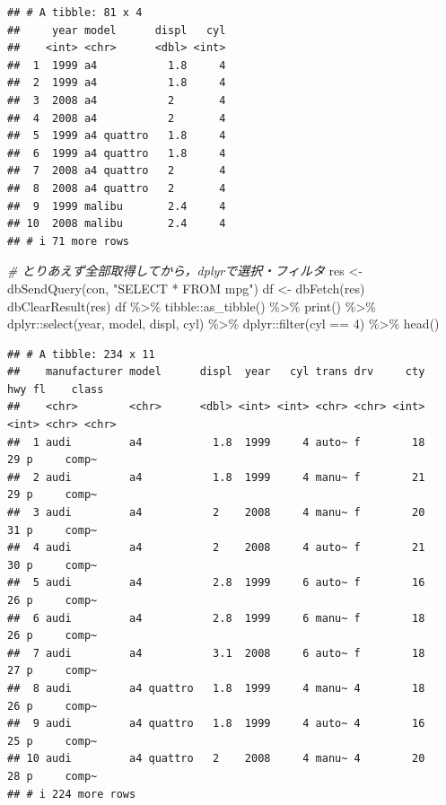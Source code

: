 \documentclass[
]{article}
\newenvironment{Shaded}{\begin{snugshade}}{\end{snugshade}}
\newcommand{\CommentTok}[1]{\textcolor[rgb]{0.56,0.35,0.01}{\textit{#1}}}
\newcommand{\DecValTok}[1]{\textcolor[rgb]{0.00,0.00,0.81}{#1}}
\newcommand{\FunctionTok}[1]{\textcolor[rgb]{0.00,0.00,0.00}{#1}}
\newcommand{\NormalTok}[1]{#1}
\newcommand{\OtherTok}[1]{\textcolor[rgb]{0.56,0.35,0.01}{#1}}
\newcommand{\SpecialCharTok}[1]{\textcolor[rgb]{0.00,0.00,0.00}{#1}}
\newcommand{\StringTok}[1]{\textcolor[rgb]{0.31,0.60,0.02}{#1}}
\begin{document}
\begin{verbatim}
## # A tibble: 81 x 4
##     year model      displ   cyl
##    <int> <chr>      <dbl> <int>
##  1  1999 a4           1.8     4
##  2  1999 a4           1.8     4
##  3  2008 a4           2       4
##  4  2008 a4           2       4
##  5  1999 a4 quattro   1.8     4
##  6  1999 a4 quattro   1.8     4
##  7  2008 a4 quattro   2       4
##  8  2008 a4 quattro   2       4
##  9  1999 malibu       2.4     4
## 10  2008 malibu       2.4     4
## # i 71 more rows
\end{verbatim}

\begin{Shaded}
\begin{Highlighting}[]
  \CommentTok{\# とりあえず全部取得してから，dplyrで選択・フィルタ}
\NormalTok{res }\OtherTok{\textless{}{-}} \FunctionTok{dbSendQuery}\NormalTok{(con, }\StringTok{"SELECT * FROM mpg"}\NormalTok{)}
\NormalTok{df }\OtherTok{\textless{}{-}} \FunctionTok{dbFetch}\NormalTok{(res)}
\FunctionTok{dbClearResult}\NormalTok{(res)}
\NormalTok{df }\SpecialCharTok{\%\textgreater{}\%}
\NormalTok{  tibble}\SpecialCharTok{::}\FunctionTok{as\_tibble}\NormalTok{() }\SpecialCharTok{\%\textgreater{}\%}
  \FunctionTok{print}\NormalTok{() }\SpecialCharTok{\%\textgreater{}\%}
\NormalTok{  dplyr}\SpecialCharTok{::}\FunctionTok{select}\NormalTok{(year, model, displ, cyl) }\SpecialCharTok{\%\textgreater{}\%}
\NormalTok{  dplyr}\SpecialCharTok{::}\FunctionTok{filter}\NormalTok{(cyl }\SpecialCharTok{==} \DecValTok{4}\NormalTok{) }\SpecialCharTok{\%\textgreater{}\%}
  \FunctionTok{head}\NormalTok{()}
\end{Highlighting}
\end{Shaded}

\begin{verbatim}
## # A tibble: 234 x 11
##    manufacturer model      displ  year   cyl trans drv     cty   hwy fl    class
##    <chr>        <chr>      <dbl> <int> <int> <chr> <chr> <int> <int> <chr> <chr>
##  1 audi         a4           1.8  1999     4 auto~ f        18    29 p     comp~
##  2 audi         a4           1.8  1999     4 manu~ f        21    29 p     comp~
##  3 audi         a4           2    2008     4 manu~ f        20    31 p     comp~
##  4 audi         a4           2    2008     4 auto~ f        21    30 p     comp~
##  5 audi         a4           2.8  1999     6 auto~ f        16    26 p     comp~
##  6 audi         a4           2.8  1999     6 manu~ f        18    26 p     comp~
##  7 audi         a4           3.1  2008     6 auto~ f        18    27 p     comp~
##  8 audi         a4 quattro   1.8  1999     4 manu~ 4        18    26 p     comp~
##  9 audi         a4 quattro   1.8  1999     4 auto~ 4        16    25 p     comp~
## 10 audi         a4 quattro   2    2008     4 manu~ 4        20    28 p     comp~
## # i 224 more rows
\end{verbatim}
\end{document}
